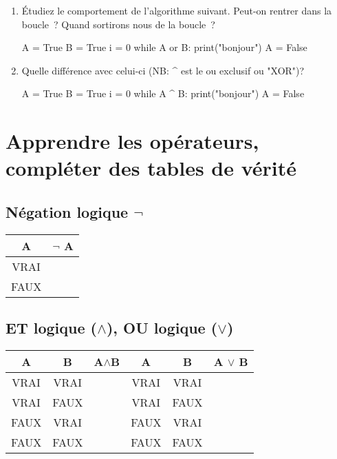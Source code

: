 \begin{enumerate}
  \item Étudiez le comportement de l'algorithme suivant. Peut-on rentrer dans la boucle ? Quand sortirons nous de la boucle ?
\begin{python}
A = True
B = True
i = 0
while A or B:
  print("bonjour")
  A = False
\end{python}

  \item Quelle différence avec celui-ci (NB: \^{} est le ou exclusif ou "XOR")?
\begin{python}
A = True
B = True
i = 0
while A ^ B:
  print("bonjour")
  A = False
\end{python}

\end{enumerate}


  \section{Apprendre les opérateurs, compléter des tables de vérité}

\subsection{Négation logique $\neg$}


\begin{tabular}{c|c}

A	&$\neg$ A\\
\hline
VRAI	&\\
\hline
FAUX	&\\
\end{tabular}

\subsection{ET logique ($\wedge $),  OU logique ($\vee $)}

\begin{tabular}{c|c|c||c|c|c}
A	&B	&A$\wedge$B&A	&B	&A $\vee$ B\\
\hline
\hline
VRAI	&VRAI	&	&VRAI	&VRAI	&\\
\hline
VRAI	&FAUX	&	&VRAI	&FAUX	&\\
\hline
FAUX	&VRAI	&	&FAUX	&VRAI	&\\
\hline
FAUX	&FAUX	&	&FAUX	&FAUX	&\\
\end{tabular}

